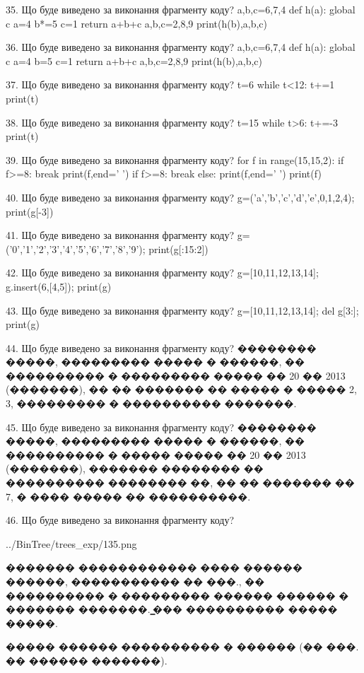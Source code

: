 \documentclass[11pt]{article}
\begin{document}
35. Що буде виведено за виконання фрагменту коду?
a,b,c=6,7,4
    def h(a):
      global c      a=4
      b*=5
      c=1
      return a+b+c
    a,b,c=2,8,9
    print(h(b),a,b,c)

36. Що буде виведено за виконання фрагменту коду?
a,b,c=6,7,4
    def h(a):
      global c      a=4
      b=5
      c=1
      return a+b+c
    a,b,c=2,8,9
    print(h(b),a,b,c)

37. Що буде виведено за виконання фрагменту коду?
t=6
   while t<12: t+=1
   print(t)

38. Що буде виведено за виконання фрагменту коду?
t=15
   while t>6: t+=-3
   print(t)

39. Що буде виведено за виконання фрагменту коду?
for f in range(15,15,2):
     if f>=8: break
     print(f,end=' ')
     if f>=8: break
   else: print(f,end=' ')
   print(f)

40. Що буде виведено за виконання фрагменту коду?
g=('a','b','c','d','e',0,1,2,4); print(g[-3])

41. Що буде виведено за виконання фрагменту коду?
g=('0','1','2','3','4','5','6','7','8','9'); print(g[:15:2])

42. Що буде виведено за виконання фрагменту коду?
g=[10,11,12,13,14]; g.insert(6,[4,5]); print(g)

43. Що буде виведено за виконання фрагменту коду?
g=[10,11,12,13,14]; del g[3:]; print(g)

44. Що буде виведено за виконання фрагменту коду?
�������� �����, ��������� ����� � ������, �� ���������� � ��������� ����� �� 20 �� 2013 (�������), �� �� ������� �� ����� � ����� 2, 3, ��������� � ���������� �������.

45. Що буде виведено за виконання фрагменту коду?
�������� �����, ��������� ����� � ������, �� ���������� � ����� ����� �� 20 �� 2013 (�������), ������� �������� �� ���������� �������� ��, �� �� ������� �� 7, � ���� ����� �� ����������.

46. Що буде виведено за виконання фрагменту коду?

\begin{center}
	{../BinTree/trees_exp/135.png}
\end{center}
������� ������������ ���� ������ ������, ����������� �� ���., �� ���������� � ��������� ������ ������ � ������� �������. ̳��� ���������� ����� �����.\par ����� ������ ���������� � ������ (�� ���. �� ������ �������).
\end{document}
